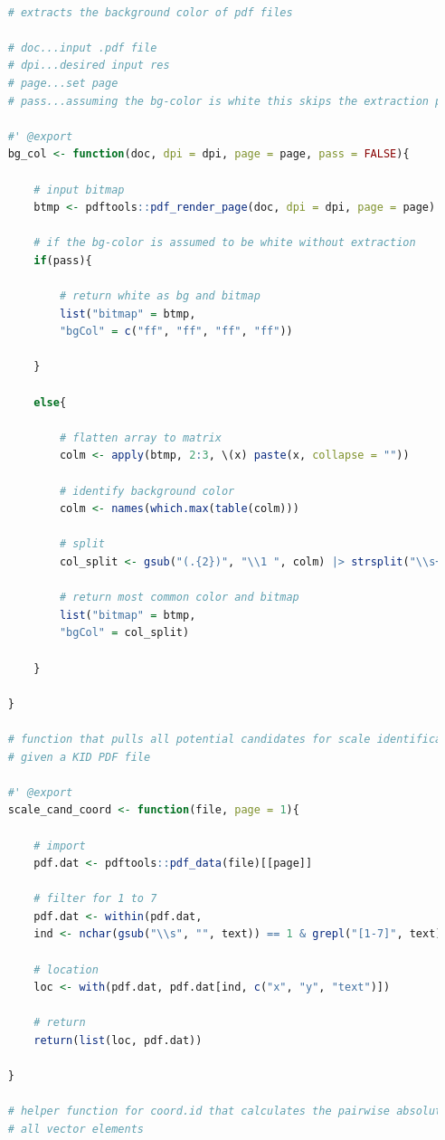 \documentclass[aodsor,preprint]{imsart}
\numberwithin{equation}{section}
\theoremstyle{plain}
\begin{document}
\begin{lstlisting}[language = R, basicstyle = \tiny]
	
	# extracts the background color of pdf files
	
	# doc...input .pdf file
	# dpi...desired input res
	# page...set page
	# pass...assuming the bg-color is white this skips the extraction process
	
	#' @export
	bg_col <- function(doc, dpi = dpi, page = page, pass = FALSE){
		
		# input bitmap
		btmp <- pdftools::pdf_render_page(doc, dpi = dpi, page = page)
		
		# if the bg-color is assumed to be white without extraction
		if(pass){
			
			# return white as bg and bitmap
			list("bitmap" = btmp,
			"bgCol" = c("ff", "ff", "ff", "ff"))
			
		}
		
		else{
			
			# flatten array to matrix
			colm <- apply(btmp, 2:3, \(x) paste(x, collapse = ""))
			
			# identify background color
			colm <- names(which.max(table(colm)))
			
			# split
			col_split <- gsub("(.{2})", "\\1 ", colm) |> strsplit("\\s+") |> unlist()
			
			# return most common color and bitmap
			list("bitmap" = btmp,
			"bgCol" = col_split)
			
		}
		
	}

	# function that pulls all potential candidates for scale identification of SRRI
	# given a KID PDF file
	
	#' @export
	scale_cand_coord <- function(file, page = 1){
		
		# import
		pdf.dat <- pdftools::pdf_data(file)[[page]]
		
		# filter for 1 to 7 
		pdf.dat <- within(pdf.dat, 
		ind <- nchar(gsub("\\s", "", text)) == 1 & grepl("[1-7]", text))
		
		# location
		loc <- with(pdf.dat, pdf.dat[ind, c("x", "y", "text")])
		
		# return 
		return(list(loc, pdf.dat))
		
	}
	
	# helper function for coord.id that calculates the pairwise absolute distance of 
	# all vector elements
	

\end{lstlisting}
\end{document}
